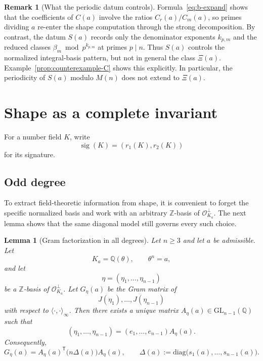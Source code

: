 \documentclass[11pt,letterpaper]{amsart}
\newcommand{\Q}{\mathbb{Q}}
\newcommand{\Z}{\mathbb{Z}}
\newcommand{\cO}{\mathcal{O}}
\newcommand{\GL}{\mathrm{GL}}
\newcommand{\diag}{\mathrm{diag}}
\theoremstyle{plain}
\newtheorem{lemma}[theorem]{Lemma}
\theoremstyle{definition}
\newtheorem{remark}[theorem]{Remark}
\begin{document}
\begin{remark}[What the periodic datum controls]
\label{rem:Sp-not-enough}
\label{rem:S-versus-C}
Formula~\eqref{eq:b-expand} shows that the coefficients of \(C(a)\) involve the
ratios \(C_r(a)/C_m(a)\), so primes dividing \(a\) re-enter the shape
computation through the strong decomposition.  By contrast, the datum \(S(a)\)
records only the denominator exponents \(k_{p,m}\) and the reduced classes
\(\beta_m \bmod p^{k_{p,m}}\) at primes \(p\mid n\).  Thus \(S(a)\) controls
the normalized integral-basis pattern, but not in general the class
\(\Xi(a)\).  Example~\ref{prop:counterexample-C} shows this explicitly.  In
particular, the periodicity of \(S(a)\) modulo \(M(n)\) does not extend to
\(\Xi(a)\).
\end{remark}

\section{Shape as a complete invariant}\label{sec:shape-complete}

For a number field $K$, write
\[
\operatorname{sig}(K)=(r_1(K),r_2(K))
\]
for its signature.


\subsection{Odd degree}

To extract field-theoretic information from shape, it is convenient to forget the specific normalized basis and work with an arbitrary \(\Z\)-basis of \(\cO_{K_a}^\perp\). The next lemma shows that the same diagonal model still governs every such choice.


\begin{lemma}[Gram factorization in all degrees]
\label{lem:all-gram-factorization}
Let \(n\ge 3\) and let \(a\) be admissible. Let
\[
K_a=\Q(\theta),\qquad \theta^n=a,
\]
and let
\[
\eta=(\eta_1,\dots,\eta_{n-1})
\]
be a \(\Z\)-basis of \(\cO_{K_a}^\perp\).
Let \(G_\eta(a)\) be the Gram matrix of
\[
J(\eta_1),\dots,J(\eta_{n-1})
\]
with respect to \(\langle\cdot,\cdot\rangle_\infty\).
Then there exists a unique matrix \(A_\eta(a)\in \GL_{n-1}(\Q)\) such that
\[
(\eta_1,\dots,\eta_{n-1})=(e_1,\dots,e_{n-1})A_\eta(a).
\]
Consequently,
\begin{equation}\label{eq:all-gram-factorization}
G_\eta(a)=A_\eta(a)^{\mathsf T}\bigl(n\Delta(a)\bigr)A_\eta(a),
\qquad
\Delta(a):=\diag\bigl(s_1(a),\dots,s_{n-1}(a)\bigr).
\end{equation}
\end{lemma}
\end{document}
